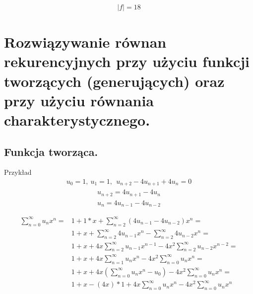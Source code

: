 \documentclass[12pt]{article}
\begin{document}
    \begin{align*}
        |f| = 18
    \end{align*}



    \newpage

    \section{Rozwiązywanie równan rekurencyjnych przy użyciu funkcji tworzących (generujących) oraz przy użyciu równania charakterystycznego.}

    \subsection{Funkcja tworząca.}

    Przykład
    \begin{align*}
        u_0 = 1, ~ u_1 = 1, ~~ u_{n+2} - 4 u_{n+1} + 4 u_n = 0
    \end{align*}
    \begin{align*}
        u_{n+2} = 4 u_{n+1} - 4 u_n
    \end{align*}
    \begin{align*}
        u_n = 4 u_{n-1} - 4 u_{n-2}
    \end{align*}

    \begin{align*}
        \sum_{n=0}^{\infty} u_n x^n = &1 + 1*x + \sum_{n=2}^{\infty} (4 u_{n-1} - 4 u_{n-2})x^n =\\
        &1 + x + \sum_{n=2}^{\infty} 4 u_{n-1} x^n - \sum_{n=2}^{\infty} 4 u_{n-2} x^n =\\
        &1 + x + 4x \sum_{n=2}^{\infty} u_{n-1} x^{n-1} - 4x^2 \sum_{n=2}^{\infty} u_{n-2} x^{n-2} =\\
        &1 + x + 4x \sum_{n=1}^{\infty} u_n x^n - 4x^2 \sum_{n=0}^{\infty} u_n x^n =\\
        &1 + x + 4x (\sum_{n=0}^{\infty} u_n x^n - u_0) - 4x^2 \sum_{n=0}^{\infty} u_n x^n =\\
        &1 + x - (4x)*1 + 4x \sum_{n=0}^{\infty} u_n x^n - 4x^2 \sum_{n=0}^{\infty} u_n x^n
    \end{align*}
\end{document}
